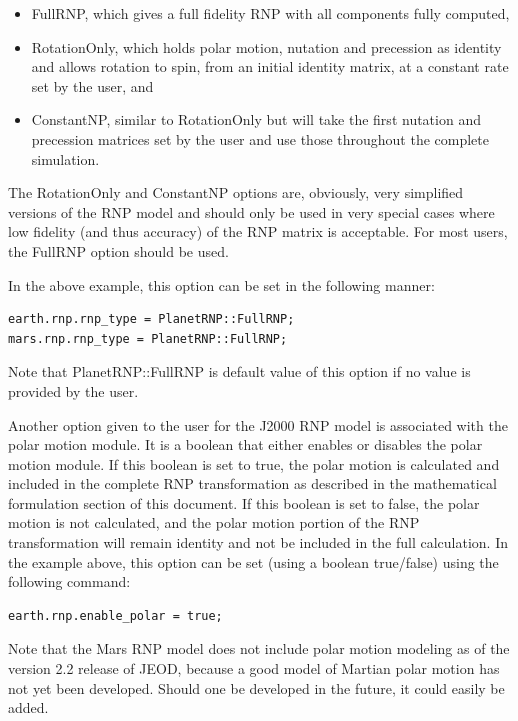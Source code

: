 \begin{itemize}
\item{FullRNP}, which gives a full fidelity RNP with all components
fully computed,
\item{RotationOnly}, which holds polar motion, nutation and precession as
identity and allows rotation to spin, from an initial identity matrix, at
a constant rate set by the user, and
\item{ConstantNP}, similar to RotationOnly but will take the first
nutation and precession matrices set by the user and use those throughout
the complete simulation.
\end{itemize}

The RotationOnly and ConstantNP options are, obviously, very simplified
versions of the RNP model and should only be used in very special cases where
low fidelity (and thus accuracy) of the RNP matrix is acceptable. For most
users, the FullRNP option should be used.

In the above example, this option can be set in the following manner:

\begin{verbatim}
earth.rnp.rnp_type = PlanetRNP::FullRNP;
mars.rnp.rnp_type = PlanetRNP::FullRNP;
\end{verbatim}

Note that PlanetRNP::FullRNP is default value of this option if no value is
provided by the user.

Another option given to the user for the J2000 RNP model is associated
with the polar motion module. It is a boolean that either enables or
disables the polar motion module. If this boolean is set to true, the polar
motion is calculated and included in the complete RNP transformation as described
in the mathematical formulation section of this document. If this boolean is
set to false, the polar motion is not calculated, and the polar motion portion
of the RNP transformation will remain identity and not be included
in the full calculation. In the example above,
this option can be set (using a boolean true/false) using the following
command:

\begin{verbatim}
earth.rnp.enable_polar = true;
\end{verbatim}

Note that the Mars RNP model does not include polar motion modeling as of the
version 2.2 release of JEOD, because a good model of Martian polar motion has
not yet been developed. Should one be developed in the future, it could easily
be added.

